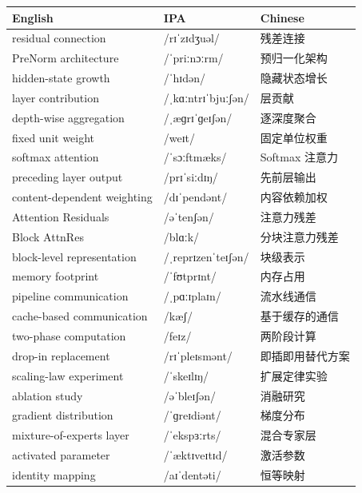 \documentclass[UTF8,12pt,a4paper]{ctexart}
\providecommand{\zh}[1]{#1}
\begin{document}
\begin{tabular*}{\textwidth}{@{\extracolsep{\fill}}lll@{}}
\toprule
\textbf{English} & \textbf{IPA} & \textbf{Chinese} \\
\midrule
residual connection & {\ipafont /rɪˈzɪdʒuəl/} & \zh{残差连接} \\
PreNorm architecture & {\ipafont /ˈpriːnɔːrm/} & \zh{预归一化架构} \\
hidden-state growth & {\ipafont /ˈhɪdən/} & \zh{隐藏状态增长} \\
layer contribution & {\ipafont /ˌkɑːntrɪˈbjuːʃən/} & \zh{层贡献} \\
depth-wise aggregation & {\ipafont /ˌæɡrɪˈɡeɪʃən/} & \zh{逐深度聚合} \\
fixed unit weight & {\ipafont /weɪt/} & \zh{固定单位权重} \\
softmax attention & {\ipafont /ˈsɔːftmæks/} & \zh{Softmax 注意力} \\
preceding layer output & {\ipafont /prɪˈsiːdɪŋ/} & \zh{先前层输出} \\
content-dependent weighting & {\ipafont /dɪˈpendənt/} & \zh{内容依赖加权} \\
Attention Residuals & {\ipafont /əˈtenʃən/} & \zh{注意力残差} \\
Block AttnRes & {\ipafont /blɑːk/} & \zh{分块注意力残差} \\
block-level representation & {\ipafont /ˌreprɪzenˈteɪʃən/} & \zh{块级表示} \\
memory footprint & {\ipafont /ˈfʊtprɪnt/} & \zh{内存占用} \\
pipeline communication & {\ipafont /ˌpɑːɪplaɪn/} & \zh{流水线通信} \\
cache-based communication & {\ipafont /kæʃ/} & \zh{基于缓存的通信} \\
two-phase computation & {\ipafont /feɪz/} & \zh{两阶段计算} \\
drop-in replacement & {\ipafont /rɪˈpleɪsmənt/} & \zh{即插即用替代方案} \\
scaling-law experiment & {\ipafont /ˈskeɪlɪŋ/} & \zh{扩展定律实验} \\
ablation study & {\ipafont /əˈbleɪʃən/} & \zh{消融研究} \\
gradient distribution & {\ipafont /ˈɡreɪdiənt/} & \zh{梯度分布} \\
mixture-of-experts layer & {\ipafont /ˈekspɜːrts/} & \zh{混合专家层} \\
activated parameter & {\ipafont /ˈæktɪveɪtɪd/} & \zh{激活参数} \\
identity mapping & {\ipafont /aɪˈdentəti/} & \zh{恒等映射} \\

\end{tabular*}
\end{document}
